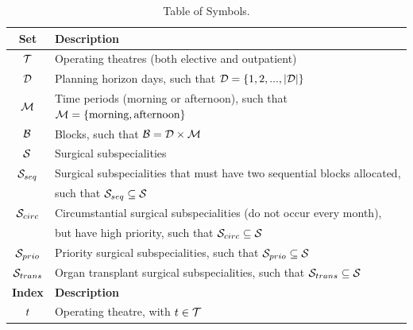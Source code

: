 \documentclass[review,3p,authoryear]{elsarticle}
\begin{document}
\begin{table}
    \centering
    \caption{\label{tab:symb}Table of Symbols.}
    \scriptsize
    \begin{tabular}{cl}
    \toprule
    \textbf{Set}                    & \textbf{Description}                                                                       \\
    \midrule
        $\mathcal{T}$                       & Operating theatres (both elective and outpatient)                       \\
        $\mathcal{D}$            & Planning horizon days, such that $\mathcal{D} = \{1, 2, ..., |\mathcal{D}|\}$  \\
        $\mathcal{M}$                 & Time periods (morning or afternoon), such that $\mathcal{M} = \{\text{morning}, \text{afternoon}\}$          \\
        $\mathcal{B}$                      & Blocks, such that $\mathcal{B} = \mathcal{D} \times \mathcal{M}$     \\
        $\mathcal{S}$                  & Surgical subspecialities                                                                \\
        $\mathcal{S}_{seq}$                 & Surgical subspecialities that must have two sequential blocks allocated,\\
                                         & such that $\mathcal{S}_{seq} \subseteq \mathcal{S}$          \\
        $\mathcal{S}_{circ}$                 & Circumstantial surgical subspecialities (do not occur every month),                      \\
                                         & but have high priority, such that $\mathcal{S}_{circ} \subseteq \mathcal{S}$              \\
        $\mathcal{S}_{prio}$                & Priority surgical subspecialities, such that $\mathcal{S}_{prio} \subseteq \mathcal{S}$  \\
        $\mathcal{S}_{trans}$                & Organ transplant surgical subspecialities, such that $\mathcal{S}_{trans} \subseteq \mathcal{S}$                                                                                                              \\
    \midrule
    \textbf{Index}                           & \textbf{Description}                                                                  \\
    \midrule
        $t$                            & Operating theatre, with $t \in \mathcal{T}$                                       \\

\end{tabular}
\end{table}
\end{document}
